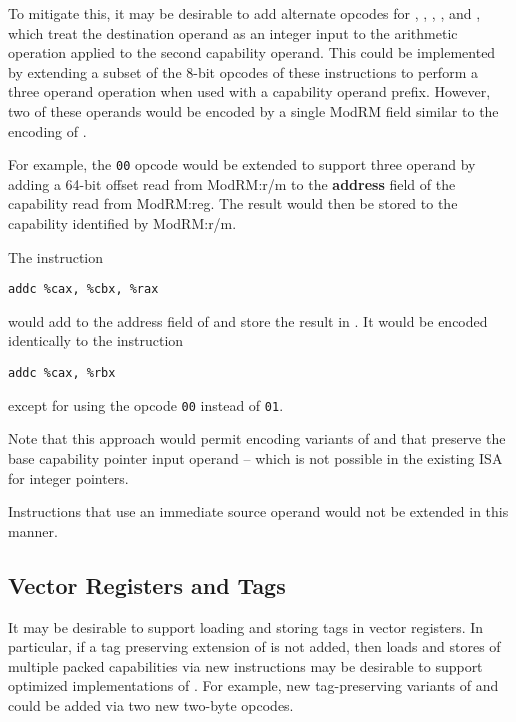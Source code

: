 To mitigate this, it may be desirable to add alternate opcodes for
, , , ,
and , which treat the destination operand as an integer
input to the arithmetic operation applied to the second capability
operand.  This could be implemented by extending a subset of the 8-bit
opcodes of these instructions to perform a three operand operation
when used with a capability operand prefix.  However, two of these
operands would be encoded by a single ModRM field similar to the
encoding of .

For example, the \texttt{00} opcode would be extended to support three
operand  by adding a 64-bit offset read from
ModRM:r/m to the \textbf{address} field of the capability read from
ModRM:reg.  The result would then be stored to the capability
identified by ModRM:r/m.

The instruction

\begin{verbatim}
addc %cax, %cbx, %rax
\end{verbatim}

would add \RAX{} to the address field of \CBX{} and store the result
in \CAX{}.  It would be encoded identically to the instruction

\begin{verbatim}
addc %cax, %rbx
\end{verbatim}

except for using the opcode \texttt{00} instead of \texttt{01}.

Note that this approach would permit encoding variants of
 and  that preserve the
base capability pointer input operand -- which is not possible in the
existing ISA for integer pointers.

Instructions that use an immediate source operand would not be
extended in this manner.

\subsection{Vector Registers and Tags}

It may be desirable to support loading and storing tags in vector
registers.  In particular, if a tag preserving extension of
 is not added, then loads and stores of multiple
packed capabilities via new instructions may be desirable to support
optimized implementations of .  For example, new
tag-preserving variants of  and 
could be added via two new two-byte opcodes.

